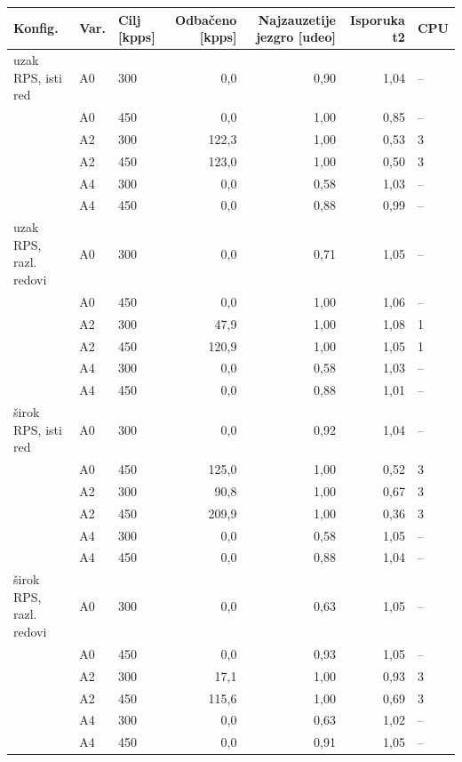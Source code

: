 \begin{tabular}{@{}lllrrrl@{}}
\toprule
Konfig. & Var. & Cilj [kpps] & Odbačeno [kpps] & Najzauzetije jezgro [udeo] & Isporuka t2 & CPU \\
\midrule
uzak RPS, isti red & A0 & 300 & 0{,}0 & 0{,}90 & 1{,}04 & -- \\
 & A0 & 450 & 0{,}0 & 1{,}00 & 0{,}85 & -- \\
 & A2 & 300 & 122{,}3 & 1{,}00 & 0{,}53 & 3 \\
 & A2 & 450 & 123{,}0 & 1{,}00 & 0{,}50 & 3 \\
 & A4 & 300 & 0{,}0 & 0{,}58 & 1{,}03 & -- \\
 & A4 & 450 & 0{,}0 & 0{,}88 & 0{,}99 & -- \\
\midrule
uzak RPS, razl. redovi & A0 & 300 & 0{,}0 & 0{,}71 & 1{,}05 & -- \\
 & A0 & 450 & 0{,}0 & 1{,}00 & 1{,}06 & -- \\
 & A2 & 300 & 47{,}9 & 1{,}00 & 1{,}08 & 1 \\
 & A2 & 450 & 120{,}9 & 1{,}00 & 1{,}05 & 1 \\
 & A4 & 300 & 0{,}0 & 0{,}58 & 1{,}03 & -- \\
 & A4 & 450 & 0{,}0 & 0{,}88 & 1{,}01 & -- \\
\midrule
širok RPS, isti red & A0 & 300 & 0{,}0 & 0{,}92 & 1{,}04 & -- \\
 & A0 & 450 & 125{,}0 & 1{,}00 & 0{,}52 & 3 \\
 & A2 & 300 & 90{,}8 & 1{,}00 & 0{,}67 & 3 \\
 & A2 & 450 & 209{,}9 & 1{,}00 & 0{,}36 & 3 \\
 & A4 & 300 & 0{,}0 & 0{,}58 & 1{,}05 & -- \\
 & A4 & 450 & 0{,}0 & 0{,}88 & 1{,}04 & -- \\
\midrule
širok RPS, razl. redovi & A0 & 300 & 0{,}0 & 0{,}63 & 1{,}05 & -- \\
 & A0 & 450 & 0{,}0 & 0{,}93 & 1{,}05 & -- \\
 & A2 & 300 & 17{,}1 & 1{,}00 & 0{,}93 & 3 \\
 & A2 & 450 & 115{,}6 & 1{,}00 & 0{,}69 & 3 \\
 & A4 & 300 & 0{,}0 & 0{,}63 & 1{,}02 & -- \\
 & A4 & 450 & 0{,}0 & 0{,}91 & 1{,}05 & -- \\
\bottomrule
\end{tabular}
